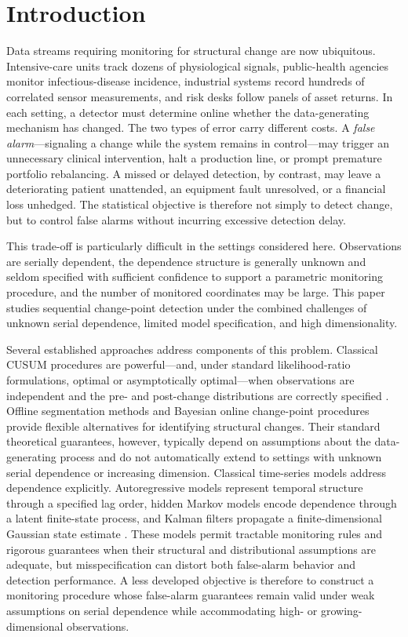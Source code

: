 \documentclass[bj,authoryear]{imsart}
\theoremstyle{plain}
\theoremstyle{definition}
\begin{document}
\section{Introduction}
\label{sec:intro}

Data streams requiring monitoring for structural change are now ubiquitous. Intensive-care units track dozens of physiological signals, public-health agencies monitor infectious-disease incidence, industrial systems record hundreds of correlated sensor measurements, and risk desks follow panels of asset returns. In each setting, a detector must determine online whether the data-generating mechanism has changed. The two types of error carry different costs. A \emph{false alarm}---signaling a change while the system remains in control---may trigger an unnecessary clinical intervention, halt a production line, or prompt premature portfolio rebalancing. A missed or delayed detection, by contrast, may leave a deteriorating patient unattended, an equipment fault unresolved, or a financial loss unhedged. The statistical objective is therefore not simply to detect change, but to control false alarms without incurring excessive detection delay.

This trade-off is particularly difficult in the settings considered here. Observations are serially dependent, the dependence structure is generally unknown and seldom specified with sufficient confidence to support a parametric monitoring procedure, and the number of monitored coordinates may be large. This paper studies sequential change-point detection under the combined challenges of unknown serial dependence, limited model specification, and high dimensionality.

Several established approaches address components of this problem. Classical CUSUM procedures are powerful—and, under standard likelihood-ratio formulations, optimal or asymptotically optimal—when observations are independent and the pre- and post-change distributions are correctly specified \citep{page1954continuous,lorden1971procedures}. Offline segmentation methods \citep{killick2012optimal} and Bayesian online change-point procedures \citep{adams2007bayesian} provide flexible alternatives for identifying structural changes. Their standard theoretical guarantees, however, typically depend on assumptions about the data-generating process and do not automatically extend to settings with unknown serial dependence or increasing dimension.
%
Classical time-series models address dependence explicitly. Autoregressive models represent temporal structure through a specified lag order, hidden Markov models encode dependence through a latent finite-state process, and Kalman filters propagate a finite-dimensional Gaussian state estimate \citep{box2015time,hamilton1994time}. These models permit tractable monitoring rules and rigorous guarantees when their structural and distributional assumptions are adequate, but misspecification can distort both false-alarm behavior and detection performance. A less developed objective is therefore to construct a monitoring procedure whose false-alarm guarantees remain valid under weak assumptions on serial dependence while accommodating high- or growing-dimensional observations.
\end{document}
